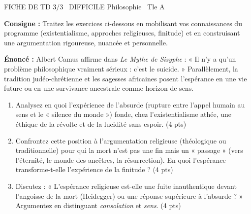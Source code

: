 \documentclass[11pt]{article}
\begin{document}
\begin{tcolorbox}[enhanced,colback=popink,colframe=popink,arc=10pt,boxrule=0pt,left=12pt,right=12pt,top=9pt,bottom=9pt]
{\color{white}\popxbold\small FICHE DE TD 3/3 \textbullet\ DIFFICILE \hfill Philosophie \textbullet\ Tle A\par}
\end{tcolorbox}
\vspace{4pt}
\noindent \textbf{Consigne :} Traitez les exercices ci-dessous en mobilisant vos connaissances du programme (existentialisme, approches religieuses, finitude) et en construisant une argumentation rigoureuse, nuancée et personnelle.

\begin{exercice}
\textbf{Énoncé :} Albert Camus affirme dans \textit{Le Mythe de Sisyphe} : « Il n'y a qu'un problème philosophique vraiment sérieux : c'est le suicide. » Parallèlement, la tradition judéo-chrétienne et les sagesses africaines posent l'espérance en une vie future ou en une survivance ancestrale comme horizon de sens. 
\begin{enumerate}
    \item Analysez en quoi l'expérience de l'absurde (rupture entre l'appel humain au sens et le « silence du monde ») fonde, chez l'existentialisme athée, une éthique de la révolte et de la lucidité sans espoir. (4 pts)
    \item Confrontez cette position à l'argumentation religieuse (théologique ou traditionnelle) pour qui la mort n'est pas une fin mais un « passage » (vers l'éternité, le monde des ancêtres, la résurrection). En quoi l'espérance transforme-t-elle l'expérience de la finitude ? (4 pts)
    \item Discutez : « L'espérance religieuse est-elle une fuite inauthentique devant l'angoisse de la mort (Heidegger) ou une réponse supérieure à l'absurde ? » Argumentez en distinguant \textit{consolation} et \textit{sens}. (4 pts)
\end{enumerate}
\end{exercice}
\end{document}
